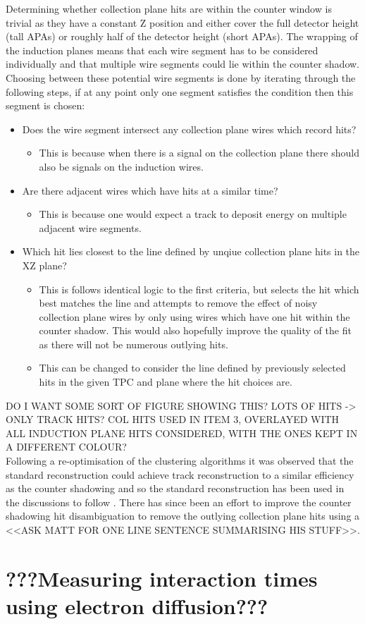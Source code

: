 Determining whether collection plane hits are within the counter window is trivial as they have a constant Z position and either cover the full detector height (tall APAs) or roughly half of the detector height (short APAs). The wrapping of the induction planes means that each wire segment has to be considered individually and that multiple wire segments could lie within the counter shadow. Choosing between these potential wire segments is done by iterating through the following steps, if at any point only one segment satisfies the condition then this segment is chosen:
\begin{itemize}
\item Does the wire segment intersect any collection plane wires which record hits?
  \begin{itemize}
  \item This is because when there is a signal on the collection plane there should also be signals on the induction wires.
  \end{itemize}
\item Are there adjacent wires which have hits at a similar time?
  \begin{itemize}
  \item This is because one would expect a track to deposit energy on multiple adjacent wire segments. 
  \end{itemize}
\item Which hit lies closest to the line defined by unqiue collection plane hits in the XZ plane?
  \begin{itemize}
  \item This is follows identical logic to the first criteria, but selects the hit which best matches the line and attempts to remove the effect of noisy collection plane wires by only using wires which have one hit within the counter shadow. This would also hopefully improve the quality of the fit as there will not be numerous outlying hits.
  \item This can be changed to consider the line defined by previously selected hits in the given TPC and plane where the hit choices are.
  \end{itemize}
\end{itemize}
DO I WANT SOME SORT OF FIGURE SHOWING THIS? LOTS OF HITS -> ONLY TRACK HITS? COL HITS USED IN ITEM 3, OVERLAYED WITH ALL INDUCTION PLANE HITS CONSIDERED, WITH THE ONES KEPT IN A DIFFERENT COLOUR? \\

Following a re-optimisation of the clustering algorithms it was observed that the standard reconstruction could achieve track reconstruction to a similar efficiency as the counter shadowing and so the standard reconstruction has been used in the discussions to follow \citep{TingjunClustering}. There has since been an effort to improve the counter shadowing hit disambiguation to remove the outlying collection plane hits using a <<ASK MATT FOR ONE LINE SENTENCE SUMMARISING HIS STUFF>>.\\




\section{???Measuring interaction times using electron diffusion???}  %

